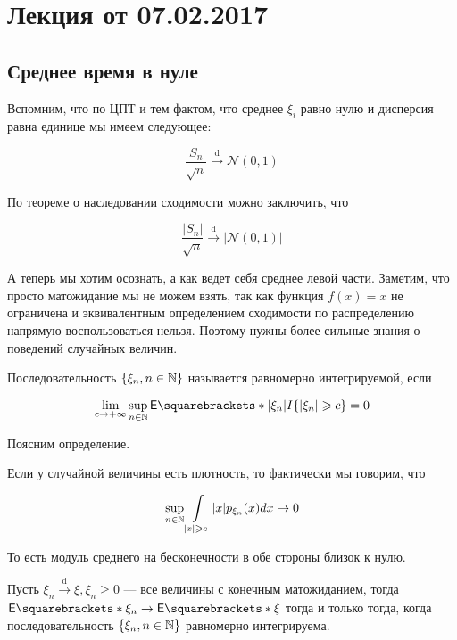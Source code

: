 \newcommand{\dto}{\xrightarrow{\mathrm{d}}}
\section{Лекция от 07.02.2017}

\subsection{Среднее время в нуле}

Вспомним, что по ЦПТ и тем фактом, что среднее $\xi_i$ равно нулю и дисперсия равна 
единице мы имеем следующее:

\[
  \frac{S_n}{\sqrt{n}} \dto \mathcal{N}(0, 1)
\]

По теореме о наследовании сходимости можно заключить, что

\[
  \frac{|S_n|}{\sqrt{n}} \dto |\mathcal{N}(0, 1)|
\]

А теперь мы хотим осознать, а как ведет себя среднее левой части. Заметим, что
просто матожидание мы не можем взять, так как функция $f(x) = x$ не ограничена
и эквивалентным определением сходимости по распределению напрямую воспользоваться
нельзя. Поэтому нужны более сильные знания о поведений случайных величин.

\begin{definition}
  Последовательность $\{\xi_n, n \in \mathbb{N}\}$ называется равномерно интегрируемой,
  если

  \[
    \lim\limits_{c \to +\infty} \sup\limits_{n \in \N} \E{|\xi_n|I\{|\xi_n| \geq c\}} = 0
  \]
\end{definition}

Поясним определение.

Если у случайной величины есть плотность, то фактически мы говорим, что

\[
  \sup\limits_{n \in \mathbb{N}} \int\limits_{|x| \geqslant c} |x| p_{\xi_n}(x) dx \to 0
\]

То есть модуль среднего на бесконечности в обе стороны близок к нулю.

\begin{theorem}
  Пусть $\xi_n \dto \xi, \xi_n \geq 0$ --- все величины с конечным матожиданием,
  тогда $\E{\xi_n} \to \E{\xi}$ тогда
  и только тогда, когда последовательность $\{\xi_n, n \in \mathbb{N}\}$ равномерно 
  интегрируема.
\end{theorem}

